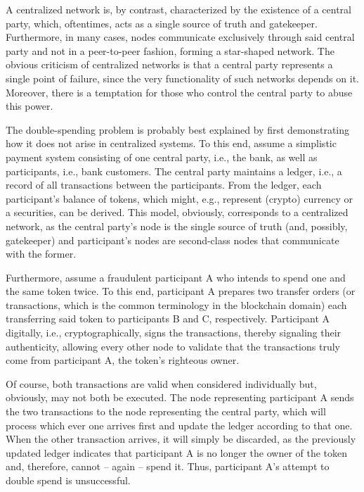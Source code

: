 A centralized network is, by contrast, characterized by the existence of a central party, which, oftentimes, acts as a single source of truth and gatekeeper.
Furthermore, in many cases, nodes communicate exclusively through said central party and not in a peer-to-peer fashion, forming a star-shaped network.
The obvious criticism of centralized networks is that a central party represents a single point of failure, since the very functionality of such networks depends on it.
Moreover, there is a temptation for those who control the central party to abuse this power.

The double-spending problem is probably best explained by first demonstrating how it does not arise in centralized systems.
To this end, assume a simplistic payment system consisting of one central party, i.e., the bank, as well as participants, i.e., bank customers.
The central party maintains a ledger, i.e., a record of all transactions between the participants.
From the ledger, each participant's balance of tokens, which might, e.g., represent (crypto) currency or a securities, can be derived.
This model, obviously, corresponds to a centralized network, as the central party's node is the single source of truth (and, possibly, gatekeeper) and participant's nodes are second-class nodes that communicate with the former.

Furthermore, assume a fraudulent participant A who intends to spend one and the same token twice.
To this end, participant A prepares two transfer orders (or transactions, which is the common terminology in the blockchain domain) each transferring said token to participants B and C, respectively.
Participant A digitally, i.e., cryptographically, signs the transactions, thereby signaling their authenticity, allowing every other node to validate that the transactions truly come from participant A, the token's righteous owner.

Of course, both transactions are valid when considered individually but, obviously, may not both be executed.
The node representing participant A sends the two transactions to the node representing the central party, which will process which ever one arrives first and update the ledger according to that one.
When the other transaction arrives, it will simply be discarded, as the previously updated ledger indicates that participant A is no longer the owner of the token and, therefore, cannot -- again -- spend it.
Thus, participant A's attempt to double spend is unsuccessful.

